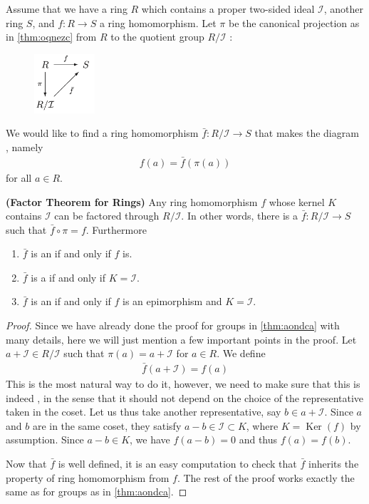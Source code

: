 \documentclass{article}
\newcommand{\bfs}[1]{\textbf{({#1}) }}
\begin{document}
Assume that we have a ring $R$ which contains a proper two-sided ideal $\mathcal{I}$, another ring $S$, and $f: R \rightarrow S$ a ring homomorphism. Let $\pi$ be the canonical projection as in \cref{thm:oqnezc} from $R$ to the quotient group $R / \mathcal{I}$ :
\begin{figure}[H]
\centering
\includegraphics[width=0.2\textwidth]{Figs/3.png}
\end{figure}
We would like to find a ring homomorphism $\bar{f}: R / \mathcal{I} \rightarrow S$ that makes the diagram , namely
\begin{align*}
f(a)=\bar{f}(\pi(a))
\end{align*}
for all $a \in R$.
\begin{thmx}\bfs{Factor Theorem for Rings}
Any ring homomorphism $f$ whose kernel $K$ contains $\mathcal{I}$ can be factored through $R / \mathcal{I}$. In other words, there is a  $\bar{f}: R / \mathcal{I} \rightarrow S$ such that $\bar{f} \circ \pi=f$. Furthermore
\begin{enumerate}
    \item $\bar{f}$ is an  if and only if $f$ is.
    \item $\bar{f}$ is a  if and only if $K=\mathcal{I}$.
    \item $\bar{f}$ is an  if and only if $f$ is an epimorphism and $K=\mathcal{I}$.
\end{enumerate}
\end{thmx}
\begin{proof}
Since we have already done the proof for groups in \cref{thm:aondca} with many details, here we will just mention a few important points in the proof.
Let $a+\mathcal{I} \in R / \mathcal{I}$ such that $\pi(a)=a+\mathcal{I}$ for $a \in R$. We define
\begin{align*}
\bar{f}(a+\mathcal{I})=f(a)
\end{align*}
This is the most natural way to do it, however, we need to make sure that this is indeed , in the sense that it should not depend on the choice of the representative taken in the coset. Let us thus take another representative, say $b \in a+\mathcal{I}$. Since $a$ and $b$ are in the same coset, they satisfy $a-b \in \mathcal{I} \subset K$, where $K=\operatorname{Ker}(f)$ by assumption. Since $a-b \in K$, we have $f(a-b)=0$ and thus $f(a)=f(b)$.

Now that $\bar{f}$ is well defined, it is an easy computation to check that $\bar{f}$ inherits the property of ring homomorphism from $f$.
The rest of the proof works exactly the same as for groups as in \cref{thm:aondca}.
\end{proof}
\end{document}
